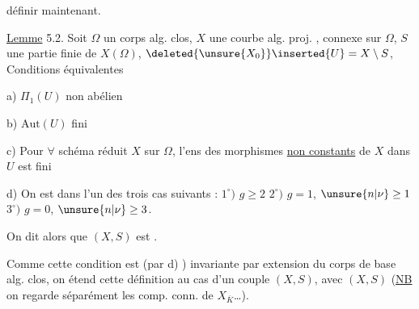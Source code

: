 

 définir maintenant.

\uline{Lemme} 5.2. Soit $\Omega$ un corps alg. clos, $X$ une  courbe alg. proj. , connexe sur $\Omega$, $S$ une partie finie de $X(\Omega)$,  $\deleted{\unsure{X_0}}\inserted{U}=X\setminus S$, Conditions équivalentes

a) $\Pi_1(U)$ non abélien

b) $\mathrm{Aut}(U)$ fini

c) Pour $\forall$ schéma  réduit $X$  sur $\Omega$, l'ens des morphismes \uline{non constants} de $X$ dans $U$ est fini

d) On est dans l'un des trois cas suivants : $1^\circ)$  $g\geq 2$ \quad $2^\circ)$ $g=1$, $\unsure{n|\nu}\geq 1$ \quad $3^\circ)$ $g=0$, $\unsure{n|\nu}\geq 3$.


 On dit alors que $(X,S)$ est . 

Comme cette condition est (par d) ) invariante par extension du corps de base alg. clos, on étend cette définition au cas d'un couple $(X,S)$, avec $(X,S)$   (\uline{NB} on regarde séparément les comp. conn. de $X_{\overline K}$\dots).

